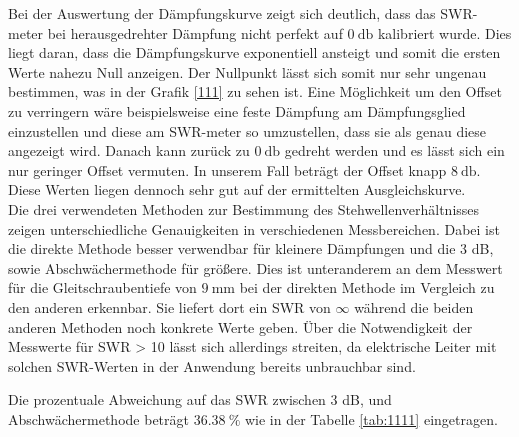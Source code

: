 \newline
Bei der Auswertung der Dämpfungskurve zeigt sich deutlich, dass das SWR-meter bei herausgedrehter Dämpfung nicht perfekt auf $\SI{0}{\decibel}$ kalibriert wurde. 
Dies liegt daran, dass die Dämpfungskurve exponentiell ansteigt und somit die ersten Werte nahezu Null anzeigen. Der Nullpunkt lässt sich somit nur sehr
ungenau bestimmen, was in der Grafik \ref{111} zu sehen ist. Eine Möglichkeit um den Offset zu verringern wäre beispielsweise eine feste Dämpfung am
Dämpfungsglied einzustellen und diese am SWR-meter so umzustellen, dass sie als genau diese angezeigt wird. Danach kann zurück zu $\SI{0}{\decibel}$ gedreht werden und
es lässt sich ein nur geringer Offset vermuten. 
In unserem Fall beträgt der Offset knapp $\SI{8}{\decibel}$. Diese Werten liegen dennoch sehr gut auf der ermittelten Ausgleichskurve.
\\ 
\newline
Die drei verwendeten Methoden zur Bestimmung des Stehwellenverhältnisses zeigen unterschiedliche Genauigkeiten in verschiedenen Messbereichen. Dabei ist die direkte Methode besser verwendbar
für kleinere Dämpfungen und die 3 dB, sowie Abschwächermethode für größere. Dies ist unteranderem an dem Messwert für die Gleitschraubentiefe von $\SI{9}{\milli\meter}$ 
bei der direkten Methode im Vergleich zu den anderen erkennbar. Sie liefert dort ein SWR von $\infty$ während die beiden anderen Methoden noch konkrete Werte geben. 
Über die Notwendigkeit der Messwerte für SWR > 10 lässt sich allerdings streiten, da elektrische Leiter mit solchen SWR-Werten in der Anwendung bereits unbrauchbar sind.
\\
\begin{flushleft}
Die prozentuale Abweichung auf das SWR zwischen 3 dB, und Abschwächermethode beträgt $\SI{36.38}{\percent}$ wie in der Tabelle \ref{tab:1111} eingetragen.
\end{flushleft}

